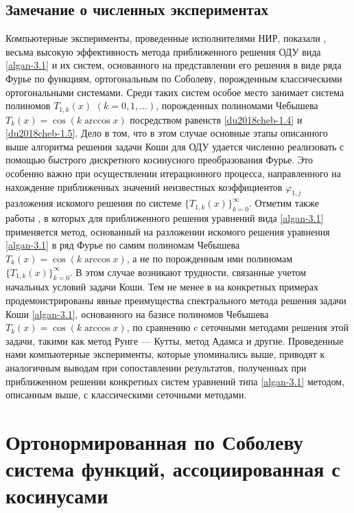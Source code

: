 \section{Замечание о численных экспериментах}
Компьютерные эксперименты, проведенные исполнителями НИР, показали \cite{MMG2016}, \cite{du2018cheb-SHII-MMG2018}  весьма высокую эффективность метода приближенного решения ОДУ вида \eqref{algan-3.1} и их систем, основанного на представлении его решения в виде ряда Фурье по функциям, ортогональным по Соболеву, порожденным классическими ортогональными системами. Среди таких систем особое место занимает система полиномов $T_{1,k}(x)$ $(k=0,1,\ldots)$, порожденных полиномами Чебышева   $T_k(x)=\cos(k\arccos x)$ посредством равенств \eqref{du2018cheb-1.4} и \eqref{du2018cheb-1.5}. Дело в том, что в этом случае основные этапы описанного выше алгоритма решения задачи Коши для ОДУ удается численно реализовать с помощью быстрого дискретного косинусного преобразования Фурье. Это особенно важно при осуществлении итерационного процесса, направленного на нахождение приближенных значений неизвестных коэффициентов $\varphi_{1,j}$ разложения искомого решения по системе $\{T_{1,k}(x)\}_{k=0}^\infty$. Отметим также работы
\cite{du2018cheb-Arush2010, du2018cheb-Arush2013, du2018cheb-Arush2014}, в которых для приближенного решения уравнений вида \eqref{algan-3.1} применяется  метод, основанный на разложении искомого решения уравнения \eqref{algan-3.1} в ряд Фурье по самим полиномам Чебышева
$T_k(x)=\cos(k\arccos x)$, а не по порожденным ими полиномам $\{T_{1,k}(x)\}_{k=0}^\infty$. В этом случае возникают трудности, связанные учетом начальных условий задачи Коши. Тем не менее в \cite{du2018cheb-Arush2010, du2018cheb-Arush2013, du2018cheb-Arush2014} на конкретных примерах продемонстрированы явные преимущества спектрального метода решения задачи Коши \eqref{algan-3.1}, основанного на базисе полиномов Чебышева $T_k(x)=\cos(k\arccos x)$, по сравнению c сеточными методами решения этой задачи, такими как метод Рунге --- Кутты, метод Адамса и другие. Проведенные нами компьютерные эксперименты, которые упоминались выше, приводят к аналогичным выводам при сопоставлении результатов, полученных при приближенном  решении конкретных систем уравнений типа \eqref{algan-3.1} методом, описанным выше, с классическими сеточными методами.




\chapter{Ортонормированная по Соболеву система функций, ассоциированная с косинусами}

